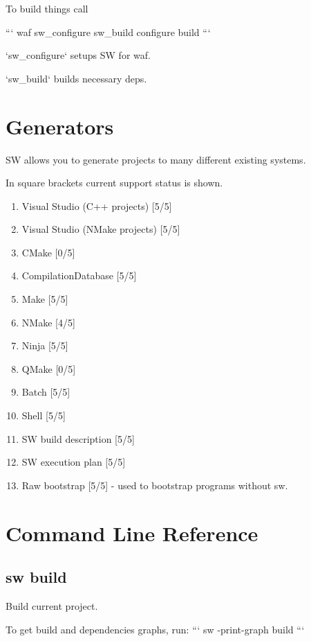 To build things call

```
waf sw_configure sw_build configure build
```

`sw_configure` setups SW for waf.

`sw_build` builds necessary deps.





\section{Generators}

SW allows you to generate projects to many different existing systems.

In square brackets current support status is shown.

\begin{enumerate}
\item
Visual Studio (C++ projects) [5/5]
\item
Visual Studio (NMake projects) [5/5]
\item
CMake [0/5]
\item
CompilationDatabase [5/5]
\item
Make [5/5]
\item
NMake [4/5]
\item
Ninja [5/5]
\item
QMake [0/5]
\item
Batch [5/5]
\item
Shell [5/5]
\item
SW build description [5/5]
\item
SW execution plan [5/5]
\item
Raw bootstrap [5/5] - used to bootstrap programs without sw.
\end{enumerate}


\section{Command Line Reference}

\subsection{sw build}

Build current project.

To get build and dependencies graphs, run:
```
sw -print-graph build
```

